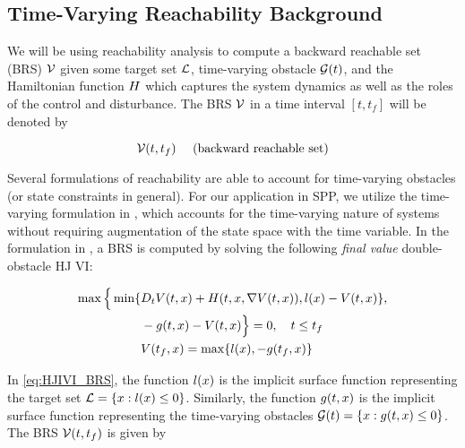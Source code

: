\subsection{Time-Varying Reachability Background \label{sec:HJIVI}}
We will be using reachability analysis to compute a backward reachable set (BRS) $\mathcal{V}$ given some target set $\mathcal{L}$, time-varying obstacle $\mathcal{G}(t)$, and the Hamiltonian function $H$ which captures the system dynamics as well as the roles of the control and disturbance. The BRS $\mathcal{V}$ in a time interval $[t, t_f]$ will be denoted by

\begin{equation}
\mathcal{V}(t, t_f) \quad \text{ (backward reachable set)}
\end{equation}

Several formulations of reachability are able to account for time-varying obstacles \cite{Bokanowski11, Fisac15} (or state constraints in general). For our application in SPP, we utilize the time-varying formulation in \cite{Fisac15}, which accounts for the time-varying nature of systems without requiring augmentation of the state space with the time variable. In the formulation in \cite{Fisac15}, a BRS is computed by solving the following \textit{final value} double-obstacle HJ VI:

\begin{equation}
\label{eq:HJIVI_BRS}
\begin{aligned}
\max \Big\{ \min \{&D_t \valfunc(t, \state) + \ham(t, \state, \nabla \valfunc(t, \state)), \fc(\state) - \valfunc(t, \state) \}, \\
&-\obsfunc(t, \state) - \valfunc(t, \state) \Big\} = 0, \quad t \le t_f \\
&\valfunc(t_f, \state) = \max\{\fc(\state), -\obsfunc(t_f, \state)\}
\end{aligned}
\end{equation}

%
%
In \eqref{eq:HJIVI_BRS}, the function $l(x)$ is the implicit surface function representing the target set $\mathcal{L} = \{x: l(x) \le 0\}$. Similarly, the function $g(t, x)$ is the implicit surface function representing the time-varying obstacles $\mathcal{G}(t) = \{x: g(t,x)\le 0\}$. The BRS $\mathcal{V}(t, t_f)$ is given by

